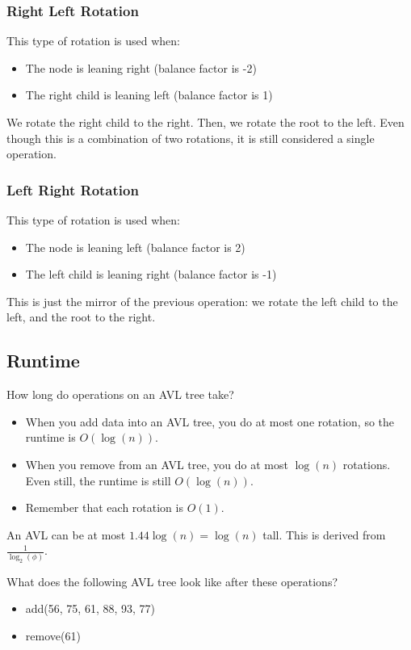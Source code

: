 
\subsubsection{Right Left Rotation}
This type of rotation is used when:
\begin{itemize}
	\item The node is leaning right (balance factor is -2)
	\item The right child is leaning left (balance factor is 1)
\end{itemize}
We rotate the right child to the right. Then, we rotate the root to the left. Even though this is a combination of two rotations, it is still considered a single operation.

\subsubsection{Left Right Rotation}
This type of rotation is used when:
\begin{itemize}
	\item The node is leaning left (balance factor is 2)
	\item The left child is leaning right (balance factor is -1)
\end{itemize}
This is just the mirror of the previous operation: we rotate the left child to the left, and the root to the right.

\subsection{Runtime}
How long do operations on an AVL tree take?
\begin{itemize}
	\item When you add data into an AVL tree, you do at most one rotation, so the runtime is \( O(\log (n)) \).
	\item When you remove from an AVL tree, you do at most \( \log (n) \) rotations. Even still, the runtime is still \( O(\log (n)) \).
	\item Remember that each rotation is \( O(1) \).
\end{itemize}

\begin{note}
	An AVL can be at most \( 1.44\log (n) =\log (n)\) tall. This is derived from \( \frac{1}{\log_2(\phi )} \).
\end{note}

What does the following AVL tree look like after these operations?
\begin{itemize}
	\item add(56, 75, 61, 88, 93, 77)
	\item remove(61)
\end{itemize}
